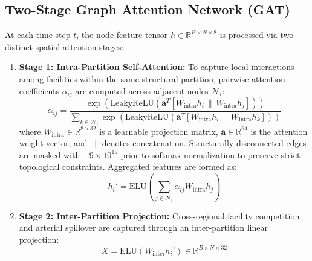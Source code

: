 \documentclass[journal]{IEEEtran}
\begin{document}
\subsection{Two-Stage Graph Attention Network (GAT)}
At each time step $t$, the node feature tensor $h \in \mathbb{R}^{B \times N \times 8}$ is processed via two distinct spatial attention stages:
\begin{enumerate}
    \item \textbf{Stage 1: Intra-Partition Self-Attention:} To capture local interactions among facilities within the same structural partition, pairwise attention coefficients $\alpha_{ij}$ are computed across adjacent nodes $\mathcal{N}_i$:
    \begin{equation}
    \alpha_{ij} = \frac{\exp\left(\text{LeakyReLU}\left(\mathbf{a}^T [W_{\text{intra}} h_i \,\|\, W_{\text{intra}} h_j]\right)\right)}{\sum_{k \in \mathcal{N}_i} \exp\left(\text{LeakyReLU}\left(\mathbf{a}^T [W_{\text{intra}} h_i \,\|\, W_{\text{intra}} h_k]\right)\right)}
    \label{eq:gat_alpha}
    \end{equation}
    where $W_{\text{intra}} \in \mathbb{R}^{8 \times 32}$ is a learnable projection matrix, $\mathbf{a} \in \mathbb{R}^{64}$ is the attention weight vector, and $\|$ denotes concatenation. Structurally disconnected edges are masked with $-9 \times 10^{15}$ prior to softmax normalization to preserve strict topological constraints. Aggregated features are formed as:
    \begin{equation}
    h_i' = \text{ELU}\left(\sum_{j \in \mathcal{N}_i} \alpha_{ij} W_{\text{intra}} h_j\right)
    \end{equation}
    \item \textbf{Stage 2: Inter-Partition Projection:} Cross-regional facility competition and arterial spillover are captured through an inter-partition linear projection:
    \begin{equation}
    X = \text{ELU}(W_{\text{inter}} h_i') \in \mathbb{R}^{B \times N \times 32}
    \end{equation}
\end{enumerate}
\end{document}
